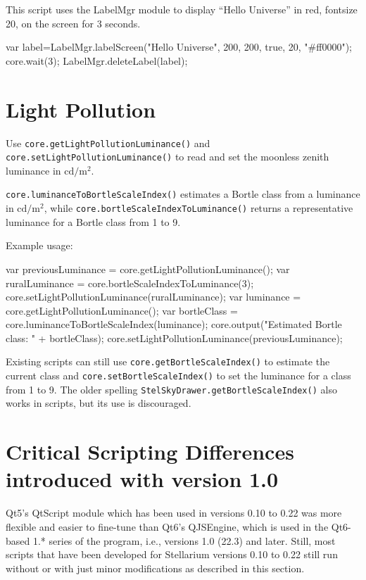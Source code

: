 \noindent This script uses the LabelMgr module to display ``Hello Universe'' in red, fontsize 20, on the screen for 3 seconds.
\begin{script}
var label=LabelMgr.labelScreen("Hello Universe", 200, 200, 
                               true, 20, "#ff0000");
core.wait(3);
LabelMgr.deleteLabel(label);
\end{script}

\section{Light Pollution}

Use \texttt{core.getLightPollutionLuminance()} and \texttt{core.setLightPollutionLuminance()} to read and set
the moonless zenith luminance in $\mathrm{cd/m^2}$.

\texttt{core.luminanceToBortleScaleIndex()} estimates a Bortle class from a luminance in $\mathrm{cd/m^2}$, while
\texttt{core.bortleScaleIndexToLuminance()} returns a representative luminance for a Bortle class from 1 to 9.

Example usage:
\begin{script}
var previousLuminance = core.getLightPollutionLuminance();
var ruralLuminance = core.bortleScaleIndexToLuminance(3);
core.setLightPollutionLuminance(ruralLuminance);
var luminance = core.getLightPollutionLuminance();
var bortleClass = core.luminanceToBortleScaleIndex(luminance);
core.output("Estimated Bortle class: " + bortleClass);
core.setLightPollutionLuminance(previousLuminance);
\end{script}

Existing scripts can still use \texttt{core.getBortleScaleIndex()} to estimate the current class and
\texttt{core.setBortleScaleIndex()} to set the luminance for a class from 1 to 9. The older spelling
\texttt{StelSkyDrawer.getBortleScaleIndex()} also works in scripts, but its use is discouraged.

\section{Critical Scripting Differences introduced with version 1.0}
\label{sec:scripting:differences}

Qt5's QtScript module which has been used in versions 0.10 to 0.22 was more flexible and easier to fine-tune than Qt6's QJSEngine, 
which is used in the Qt6-based 1.* series of the program, i.e., versions 1.0 (22.3) and later. 
Still, most scripts that have been developed for Stellarium versions 0.10 to 0.22 
still run without or with just minor modifications as described in this section. 

